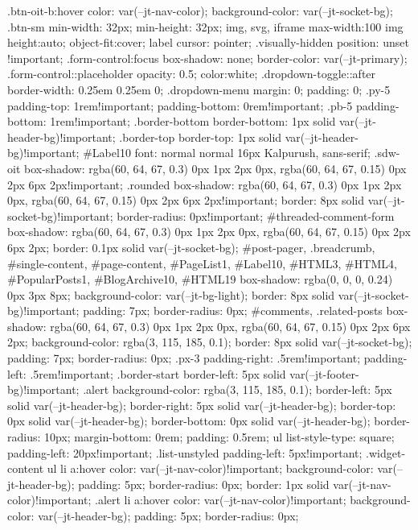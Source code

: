 .btn-oit-b:hover{
color: var(--jt-nav-color);
background-color: var(--jt-socket-bg);
}
.btn-sm {
min-width: 32px;
min-height: 32px;
}
img,
svg,
iframe {
max-width:100%
}
img {
height:auto;
object-fit:cover;
}
label {
cursor: pointer;
}
.visually-hidden {
position: unset !important;
}
.form-control:focus {
box-shadow: none;
border-color: var(--jt-primary);
}
.form-control::placeholder {
opacity: 0.5;
color:white;
}
.dropdown-toggle::after {
border-width: 0.25em 0.25em 0;
}
.dropdown-menu {
margin: 0;
padding: 0;
}
.py-5 {
padding-top: 1rem!important;
padding-bottom: 0rem!important;
}
.pb-5 {
padding-bottom: 1rem!important;
}
.border-bottom {
border-bottom: 1px solid var(--jt-header-bg)!important;
}
.border-top {
border-top: 1px solid var(--jt-header-bg)!important;
}
#Label10{
font: normal normal 16px Kalpurush, sans-serif;
}
.sdw-oit {
box-shadow: rgba(60, 64, 67, 0.3) 0px 1px 2px 0px, rgba(60, 64, 67, 0.15) 0px 2px 6px 2px!important;
}
.rounded {
box-shadow: rgba(60, 64, 67, 0.3) 0px 1px 2px 0px, rgba(60, 64, 67, 0.15) 0px 2px 6px 2px!important;
border: 8px solid var(--jt-socket-bg)!important;
border-radius: 0px!important;
}
#threaded-comment-form{
box-shadow: rgba(60, 64, 67, 0.3) 0px 1px 2px 0px, rgba(60, 64, 67, 0.15) 0px 2px 6px 2px;
border: 0.1px solid var(--jt-socket-bg);
}
#post-pager, .breadcrumb, #single-content, #page-content, #PageList1, #Label10, #HTML3, #HTML4, #PopularPosts1, #BlogArchive10, #HTML19 {
box-shadow: rgba(0, 0, 0, 0.24) 0px 3px 8px;
background-color: var(--jt-bg-light);
border: 8px solid var(--jt-socket-bg)!important;
padding: 7px;
border-radius: 0px;
}
#comments, .related-posts{
box-shadow: rgba(60, 64, 67, 0.3) 0px 1px 2px 0px, rgba(60, 64, 67, 0.15) 0px 2px 6px 2px;
background-color: rgba(3, 115, 185, 0.1);
border: 8px solid var(--jt-socket-bg);
padding: 7px;
border-radius: 0px;
}
.px-3 {
padding-right: .5rem!important;
padding-left: .5rem!important;
}
.border-start {
border-left: 5px solid var(--jt-footer-bg)!important;
}
.alert {
background-color: rgba(3, 115, 185, 0.1);
border-left: 5px solid var(--jt-header-bg);
border-right: 5px solid var(--jt-header-bg);
border-top: 0px solid var(--jt-header-bg);
border-bottom: 0px solid var(--jt-header-bg);
border-radius: 10px;
margin-bottom: 0rem;
padding: 0.5rem;
}
ul {
list-style-type: square;
padding-left: 20px!important;
}
.list-unstyled{
padding-left: 5px!important;
}
.widget-content ul li a:hover{
color: var(--jt-nav-color)!important;
background-color: var(--jt-header-bg);
padding: 5px;
border-radius: 0px;
border: 1px solid var(--jt-nav-color)!important;
}
.alert li a:hover{
color: var(--jt-nav-color)!important;
background-color: var(--jt-header-bg);
padding: 5px;
border-radius: 0px;
}
